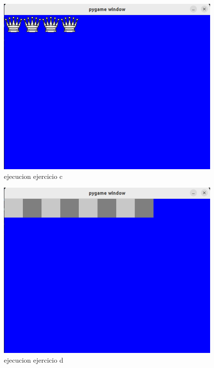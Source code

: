 \documentclass{article}
\begin{document}
\begin{figure}[H]
    \centering
    \includegraphics[scale=0.3]{img/capturaEjercicio2c.png}
    \caption{ejecucion ejercicio c}
\end{figure}
\begin{figure}[H]
    \centering
    \includegraphics[scale=0.3]{img/capturaEjercicio2d.png}
    \caption{ejecucion ejercicio d}
\end{figure}
\end{document}
